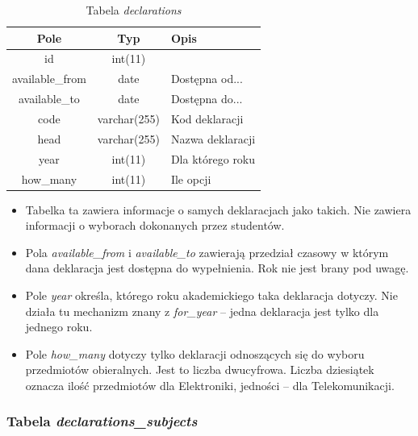\documentclass[a4paper,12pt,oneside]{report}
\begin{document}
\begin{table}[h]
  \centering
  \begin{tabular}{|c|c|l|}\hline
  Pole & Typ & Opis \\\hline
  id   & int(11)   & \\
  available\_from & date         & Dostępna od... \\
  available\_to   & date         & Dostępna do... \\
  code            & varchar(255) & Kod deklaracji \\
  head            & varchar(255) & Nazwa deklaracji \\
  year            & int(11)      & Dla którego roku \\
  how\_many       & int(11)      & Ile opcji \\\hline

  \end{tabular}
  \caption{Tabela \emph{declarations}\label{tab:declarations}}
\end{table}

\begin{itemize}
  \item Tabelka ta zawiera informacje o samych deklaracjach jako takich. Nie zawiera informacji o wyborach dokonanych przez studentów.
  \item Pola \emph{available\_from} i \emph{available\_to} zawierają przedział czasowy w którym dana deklaracja jest dostępna do wypełnienia. Rok nie jest brany pod uwagę.
  \item Pole \emph{year} określa, którego roku akademickiego taka deklaracja dotyczy. Nie działa tu mechanizm znany z \emph{for\_year} -- jedna deklaracja jest tylko dla jednego roku.
  \item Pole \emph{how\_many} dotyczy tylko deklaracji odnoszących się do wyboru przedmiotów obieralnych. Jest to liczba dwucyfrowa. Liczba dziesiątek oznacza ilość przedmiotów dla Elektroniki, jedności -- dla Telekomunikacji.
\end{itemize}

\subsubsection{Tabela \emph{declarations\_subjects}}
\label{subsub:declarations_subjects}
\end{document}
